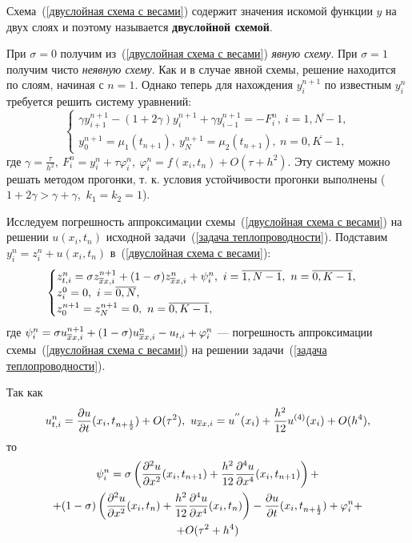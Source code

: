 \begin{Commentwhite}
Схема~(\ref{двуслойная схема с весами}) содержит значения искомой функции $y$ на двух слоях и поэтому называется \textbf{двуслойной схемой}.

При $\sigma=0$ получим из~(\ref{двуслойная схема с весами}) \emph{явную схему}. При $\sigma=1$ получим чисто \emph{неявную схему}. Как и в случае явной схемы, решение находится по слоям, начиная с $n=1$. Однако теперь для нахождения $y_i^{n+1}$ по известным $y_i^n$ требуется решить систему уравнений:
\begin{equation*}
    \begin{cases}
        \gamma y_{i+1}^{n+1} - (1 + 2\gamma)y_i^{n+1} + \gamma y_{i-1}^{n+1} = -F_i^n,~i=\overline{1,N-1},
        \\
        y_0^{n+1} = \mu_1(t_{n+1}),~y_N^{n+1} = \mu_2(t_{n+1}),~n=\overline{0,K-1},
    \end{cases}
\end{equation*}
где $\gamma = \frac{\tau}{h^2},~F_i^n = y_i^n + \tau\varphi_i^n,~\varphi_i^n = f(x_i, t_n) + O(\tau + h^2)$. Эту систему можно решать методом прогонки, т. к. условия устойчивости прогонки выполнены ($1 + 2\gamma > \gamma + \gamma$,~$k_1 = k_2 = 1$).

Исследуем погрешность аппроксимации схемы~(\ref{двуслойная схема с весами}) на решении $u(x_i,t_n)$ исходной задачи~(\ref{задача теплопроводности}). Подставим $y_i^n = z_i^n + u(x_i, t_n)$ в~(\ref{двуслойная схема с весами}):
\begin{equation*}
    \begin{cases}
        z_{t,i}^n = \sigma z_{\overline{x}x,i}^{n+1} + (1 - \sigma)z_{\overline{x}x,i}^n + \psi_i^n,~i=\overline{1,N-1},~n=\overline{0,K-1},
        \\
        z_i^0 = 0,~i=\overline{0,N},
        \\
        z_0^{n+1} = z_N^{n+1} = 0,~n=\overline{0,K-1},
    \end{cases}
\end{equation*}
где $\psi_i^n = \sigma u_{\overline{x}x,i}^{n+1} + (1 - \sigma)u_{\overline{x}x,i}^n - u_{t,i} + \varphi_i^n$ --- погрешность аппроксимации схемы~(\ref{двуслойная схема с весами}) на решении задачи~(\ref{задача теплопроводности}).

Так как
\begin{equation*}
    u_{t,i}^n = \frac{\partial u}{\partial t}(x_i,t_{n+\frac{1}{2}}) + O(\tau^2),~u_{\overline{x}x,i} = u^{''}(x_i) + \frac{h^2}{12}u^{(4)}(x_i) + O(h^4),
\end{equation*}
то
\begin{gather*}
    \psi_i^n = \sigma\left( \frac{\partial^2 u}{\partial x^2}(x_i,t_{n+1}) + \frac{h^2}{12}\frac{\partial^{4} u}{\partial x^{4}}(x_i,t_{n+1})\right) +
    \\
    + (1 - \sigma)\left( \frac{\partial^2 u}{\partial x^2}(x_i,t_n) + \frac{h^2}{12}\frac{\partial^{4} u}{\partial x^{4}}(x_i,t_n)\right) - \frac{\partial u}{\partial t}(x_i,t_{n+\frac{1}{2}}) + \varphi_i^n + 
    \\
    + O(\tau^2 + h^4)
\end{gather*}


\end{Commentwhite}
